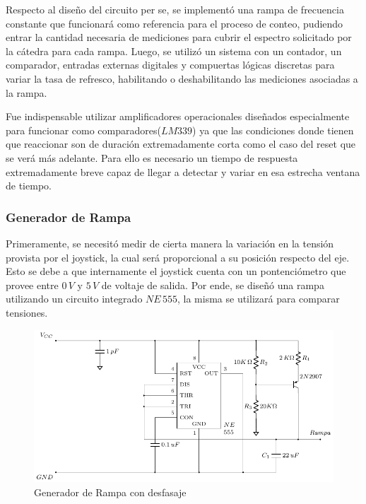 Respecto al diseño del circuito per se, se implementó una rampa de frecuencia constante que funcionará como referencia para el proceso de conteo, pudiendo entrar la cantidad necesaria de mediciones para cubrir el espectro solicitado por la cátedra para cada rampa. Luego, se utilizó un sistema con un contador, un comparador, entradas externas digitales y compuertas lógicas discretas para variar la tasa de refresco, habilitando o deshabilitando las mediciones asociadas a la rampa. \par 

Fue indispensable utilizar amplificadores operacionales diseñados especialmente para funcionar como comparadores($LM339$) ya que las condiciones donde tienen que reaccionar son de duración extremadamente corta como el caso del reset que se verá más adelante. Para ello es necesario un tiempo de respuesta extremadamente breve capaz de llegar a detectar y variar en esa estrecha ventana de tiempo.


\subsubsection{Generador de Rampa}

Primeramente, se necesitó medir de cierta manera la variación en la tensión provista por el joystick, la cual será proporcional a su posición respecto del eje. Esto se debe a que internamente el joystick cuenta con un pontenciómetro que provee entre $0\,V$ y $5\,V$ de voltaje de salida. Por ende, se diseñó una rampa utilizando un circuito integrado $NE\,555$, la misma se utilizará para comparar tensiones. \par

\begin{figure}[H]
\centering
\includegraphics[scale=0.8]{Ejercicio8/Circuitos/Generador_de_rampa.pdf}
\caption{Generador de Rampa con desfasaje}
\label{fig:Generador_de_rampa}
\end{figure}

